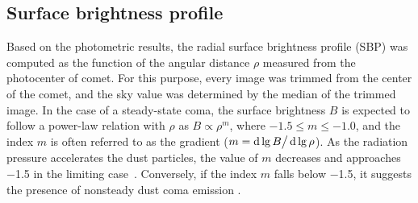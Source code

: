 

\subsection{Surface brightness profile}

Based on the photometric results, the radial surface brightness profile (SBP) was computed as the function of the angular distance $\rho$ measured from the photocenter of comet. For this purpose, every image was trimmed from the center of the comet, and the sky value was determined by the median of the trimmed image. 
In the case of a steady-state coma, the surface brightness $B$ is expected to follow a power-law relation with $\rho$ as $B \propto \rho^m$, where $-1.5 \leqslant m \leqslant -1.0$, and the index $m$ is often referred to as the gradient ($m=\mathop{}\!\mathrm{d}\lg{B} \big/ \mathop{}\!\mathrm{d}\lg{\rho}$). As the radiation pressure accelerates the dust particles, the value of $m$ decreases and approaches \num{-1.5} in the limiting case~\citep{jewitt_surface_1987}. Conversely, if the index $m$ falls below \num{-1.5}, it suggests the presence of nonsteady dust coma emission \citep{lowry_ccd_1999}.

